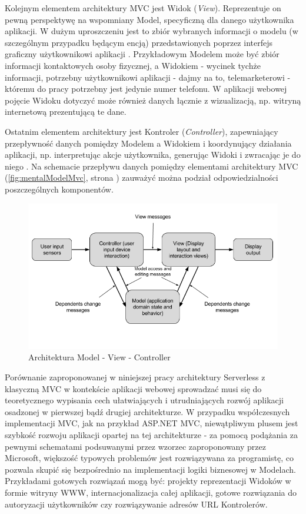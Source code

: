 \documentclass[oneside]{mgr}
\begin{document}
Kolejnym elementem architektury MVC jest Widok (\textit{View}). Reprezentuje on pewną perspektywę na wspomniany Model, specyficzną dla danego użytkownika aplikacji. W dużym uproszczeniu jest to zbiór wybranych informacji o modelu (w szczególnym przypadku będącym encją) przedstawionych poprzez interfejs graficzny użytkownikowi aplikacji \cite{artimaDciArchitecture}. Przykładowym Modelem może być zbiór informacji kontaktowych osoby fizycznej, a Widokiem - wycinek tychże informacji, potrzebny użytkownikowi aplikacji - dajmy na to, telemarketerowi - któremu do pracy potrzebny jest jedynie numer telefonu. W aplikacji webowej pojęcie Widoku dotyczyć może również danych łącznie z wizualizacją, np. witryną internetową prezentującą te dane.

Ostatnim elementem architektury jest Kontroler (\textit{Controller}), zapewniający przepływność danych pomiędzy Modelem a Widokiem i koordynujący działania aplikacji, np. interpretując akcje użytkownika, generując Widoki i zwracając je do niego \cite{artimaDciArchitecture}. Na schemacie przepływu danych pomiędzy elementami architektury MVC (\ref{fig:mentalModelMvc}, strona \pageref{fig:mentalModelMvc}) zauważyć można podział odpowiedzialności poszczególnych komponentów.

\begin{figure}
	\centering
	\includegraphics[width=15cm]{mvc-scheme}
	\caption{Architektura Model - View - Controller \cite{krasnerPopeMvcUiParadigm}}
	\label{fig:mvcArchitecture}
\end{figure}

Porównanie zaproponowanej w niniejszej pracy architektury Serverless z klasyczną MVC w kontekście aplikacji webowej sprowadzać musi się do teoretycznego wypisania cech ułatwiających i utrudniających rozwój aplikacji osadzonej w pierwszej bądź drugiej architekturze. W przypadku współczesnych implementacji MVC, jak na przykład ASP.NET MVC, niewątpliwym plusem jest szybkość rozwoju aplikacji opartej na tej architekturze - za pomocą podążania za pewnymi schematami podsuwanymi przez wzorzec zaproponowany przez Microsoft, większość typowych problemów jest rozwiązywana za programistę, co pozwala skupić się bezpośrednio na implementacji logiki biznesowej w Modelach. Przykładami gotowych rozwiązań mogą być: projekty reprezentacji Widoków w formie witryny WWW, internacjonalizacja całej aplikacji, gotowe rozwiązania do autoryzacji użytkowników czy rozwiązywanie adresów URL Kontrolerów.
\end{document}
